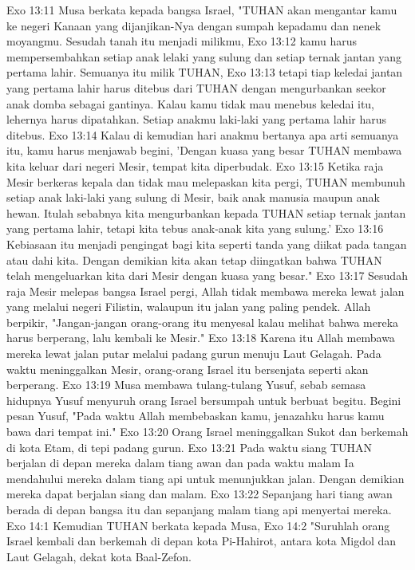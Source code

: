 Exo 13:11  Musa berkata kepada bangsa Israel, "TUHAN akan mengantar kamu ke negeri Kanaan yang dijanjikan-Nya dengan sumpah kepadamu dan nenek moyangmu. Sesudah tanah itu menjadi milikmu,
Exo 13:12  kamu harus mempersembahkan setiap anak lelaki yang sulung dan setiap ternak jantan yang pertama lahir. Semuanya itu milik TUHAN,
Exo 13:13  tetapi tiap keledai jantan yang pertama lahir harus ditebus dari TUHAN dengan mengurbankan seekor anak domba sebagai gantinya. Kalau kamu tidak mau menebus keledai itu, lehernya harus dipatahkan. Setiap anakmu laki-laki yang pertama lahir harus ditebus.
Exo 13:14  Kalau di kemudian hari anakmu bertanya apa arti semuanya itu, kamu harus menjawab begini, 'Dengan kuasa yang besar TUHAN membawa kita keluar dari negeri Mesir, tempat kita diperbudak.
Exo 13:15  Ketika raja Mesir berkeras kepala dan tidak mau melepaskan kita pergi, TUHAN membunuh setiap anak laki-laki yang sulung di Mesir, baik anak manusia maupun anak hewan. Itulah sebabnya kita mengurbankan kepada TUHAN setiap ternak jantan yang pertama lahir, tetapi kita tebus anak-anak kita yang sulung.'
Exo 13:16  Kebiasaan itu menjadi pengingat bagi kita seperti tanda yang diikat pada tangan atau dahi kita. Dengan demikian kita akan tetap diingatkan bahwa TUHAN telah mengeluarkan kita dari Mesir dengan kuasa yang besar."
Exo 13:17  Sesudah raja Mesir melepas bangsa Israel pergi, Allah tidak membawa mereka lewat jalan yang melalui negeri Filistin, walaupun itu jalan yang paling pendek. Allah berpikir, "Jangan-jangan orang-orang itu menyesal kalau melihat bahwa mereka harus berperang, lalu kembali ke Mesir."
Exo 13:18  Karena itu Allah membawa mereka lewat jalan putar melalui padang gurun menuju Laut Gelagah. Pada waktu meninggalkan Mesir, orang-orang Israel itu bersenjata seperti akan berperang.
Exo 13:19  Musa membawa tulang-tulang Yusuf, sebab semasa hidupnya Yusuf menyuruh orang Israel bersumpah untuk berbuat begitu. Begini pesan Yusuf, "Pada waktu Allah membebaskan kamu, jenazahku harus kamu bawa dari tempat ini."
Exo 13:20  Orang Israel meninggalkan Sukot dan berkemah di kota Etam, di tepi padang gurun.
Exo 13:21  Pada waktu siang TUHAN berjalan di depan mereka dalam tiang awan dan pada waktu malam Ia mendahului mereka dalam tiang api untuk menunjukkan jalan. Dengan demikian mereka dapat berjalan siang dan malam.
Exo 13:22  Sepanjang hari tiang awan berada di depan bangsa itu dan sepanjang malam tiang api menyertai mereka.
Exo 14:1  Kemudian TUHAN berkata kepada Musa,
Exo 14:2  "Suruhlah orang Israel kembali dan berkemah di depan kota Pi-Hahirot, antara kota Migdol dan Laut Gelagah, dekat kota Baal-Zefon.

